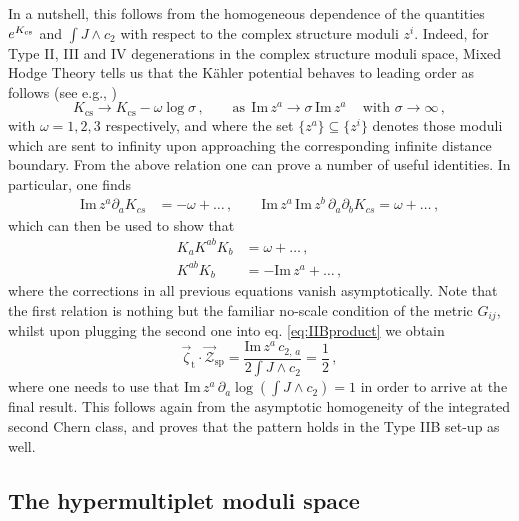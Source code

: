 In a nutshell, this follows from the homogeneous dependence of the quantities $e^{K_{\rm cs}}$ and $\int J\wedge c_2$ with respect to the complex structure moduli $z^i$. Indeed, for Type II, III and IV degenerations in the complex structure moduli space, Mixed Hodge Theory tells us that the K\"ahler potential behaves to leading order as follows (see e.g., \cite{Grimm:2018cpv})
%
\begin{equation}
	K_{\text{cs}} \to K_{\text{cs}} - \omega \log \sigma\, , \qquad \text{as}\ \ \text{Im}\, z^a \to \sigma\, \text{Im}\, z^a\, \quad \text{with }\sigma\rightarrow \infty\, ,
\end{equation}
%
with $\omega=1,2,3$ respectively, and where the set $\lbrace z^a \rbrace \subseteq \lbrace z^i \rbrace$ denotes those moduli which are sent to infinity upon approaching the corresponding infinite distance boundary. From the above relation one can prove a number of useful identities. In particular, one finds
%
\begin{align}
	\text{Im}\, z^a \partial_a K_{cs} &= -\omega + \ldots\, , \qquad \text{Im}\, z^a\, \text{Im}\, z^b\, \partial_a \partial_b K_{cs} = \omega + \ldots\, ,
\end{align}
%
which can then be used to show that
%
\begin{subequations}
	\begin{align}
		K_a K^{a b} K_b &= \omega+\dots \, ,\\
		K^{ab} K_b &= -\text{Im}\, z^a+\dots \, ,
	\end{align}
\end{subequations}
%
where the corrections in all previous equations vanish asymptotically. Note that the first relation is nothing but the familiar no-scale condition of the metric $G_{i j}$, whilst upon plugging the second one into eq. \eqref{eq:IIBproduct} we obtain
%
\begin{equation}
	\vec{\zeta}_{\text{t}} \cdot \vec{\mathcal{Z}}_{\text{sp}} = \frac{\text{Im}\, z^a\, c_{2,\, a}}{2\int J\wedge c_2} = \frac{1}{2}\, ,
\end{equation}
%
where one needs to use that $\text{Im}\, z^a\, \partial_a \log \left( \int J\wedge c_2\right) =1$ in order to arrive at the final result. This follows again from the asymptotic homogeneity of the integrated second Chern class, and proves that the pattern holds in the Type IIB set-up as well.
	
	
\subsection{The hypermultiplet moduli space}
\label{ss:hypers}
	
